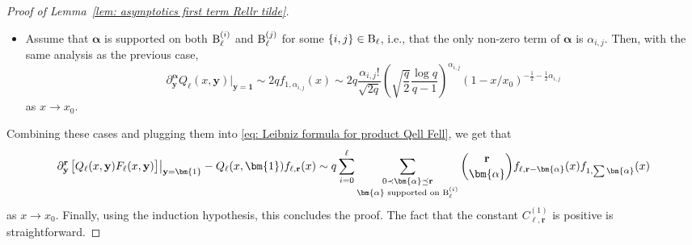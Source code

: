 \documentclass{article}
\theoremstyle{remark}
\newcommand{\pairs}{{\rm B}}
\newcommand{\by}{{\mathbf{y}}}
\newcommand{\br}{{\mathbf{r}}}
\begin{document}
\begin{proof}[Proof of Lemma~\ref{lem: asymptotics first term Rellr tilde}]
\begin{itemize}
\begin{equation*}
    \end{equation*}
    as $x\to x_0$.
    \item Assume that $\bm{\alpha}$ is supported on both $\pairs_\ell^{(i)}$ and $\pairs_\ell^{(j)}$ for some $\{i,j\}\in \pairs_\ell$, i.e., that the only non-zero term of $\bm{\alpha}$ is $\alpha_{i,j}$.
    Then, with the same analysis as the previous case,
    \begin{equation*}
        \partial_\by^{\bm{\alpha}} Q_\ell(x,\by) \vert_{\by=\bm{1}}
        \sim 2qf_{1,\alpha_{i,j}}(x)
        \sim 2q \frac{\alpha_{i,j}!}{\sqrt{2q}} \left( \sqrt{\frac{q}{2}} \frac{\log q}{q-1} \right)^{\alpha_{i,j}} \left( 1 - {x}/{x_0} \right)^{-\frac12-\frac12\alpha_{i,j}}
    \end{equation*}
    as $x\to x_0$.
\end{itemize}
Combining these cases and plugging them into \eqref{eq: Leibniz formula for product Qell Fell}, we get that
\begin{equation*}
    \partial_\by^\br {\left. \left[\big. Q_\ell(x,\by) F_\ell(x,\by) \right] \right\vert_{\by=\bm{1}} }
    - Q_\ell(x,\bm{1}) f_{\ell,\br}(x)
    \sim q\sum_{i=0}^\ell \sum_{\substack{0\prec \bm{\alpha}\preceq \br \\ \bm{\alpha} \text{ supported on } \pairs_\ell^{(i)}}} 
    \binom{\br}{\bm{\alpha}}
    f_{\ell,\br-\bm{\alpha}}(x) f_{1,\sum\bm{\alpha}}(x)
\end{equation*}
as $x\to x_0$.
Finally, using the induction hypothesis, this concludes the proof.
The fact that the constant $C_{\ell,\br}^{(1)}$ is positive is straightforward.
\end{proof}
\end{document}
